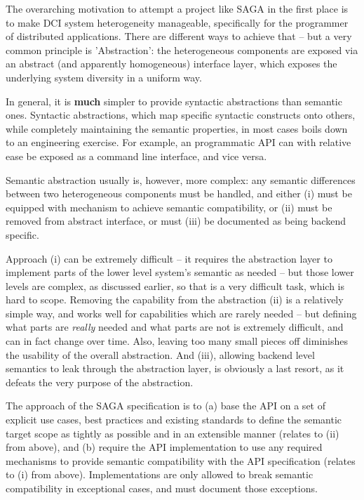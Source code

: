 \documentclass[a4paper,12pt]{article}
\newcommand{\I}[1]{\textit{#1}}
\newcommand{\B}[1]{\textbf{#1}}
\begin{document}
    The overarching motivation to attempt a project like SAGA in the
    first place is to make DCI system heterogeneity manageable,
    specifically for the programmer of distributed applications.
    There are different ways to achieve that -- but a very common
    principle is 'Abstraction': the heterogeneous components are
    exposed via an abstract (and apparently homogeneous) interface
    layer, which exposes the underlying system diversity in a uniform
    way.

    In general, it is \B{much} simpler to provide syntactic
    abstractions than semantic ones.  Syntactic abstractions, which
    map specific syntactic constructs onto others, while completely
    maintaining the semantic properties, in most cases boils down to
    an engineering exercise.  For example, an programmatic API can
    with relative ease be exposed as a command line interface, and
    vice versa.

    Semantic abstraction usually is, however, more complex: any
    semantic differences between two heterogeneous components must be
    handled, and either (i) must be equipped with mechanism to achieve
    semantic compatibility, or (ii) must be removed from abstract
    interface, or must (iii) be documented as being backend specific.

    Approach (i) can be extremely difficult -- it requires the
    abstraction layer to implement parts of the lower level system's
    semantic as needed -- but those lower levels are complex, as 
    discussed earlier, so that is a very difficult task, which is hard
    to scope.  Removing the capability from the abstraction (ii) is a
    relatively simple way, and works well for capabilities which are
    rarely needed -- but defining what parts are \I{really} needed and
    what parts are not is extremely difficult, and can in fact change
    over time.  Also, leaving too many small pieces off diminishes the
    usability of the overall abstraction.  And (iii), allowing backend
    level semantics to leak through the abstraction layer, is
    obviously a last resort, as it defeats the very purpose of the
    abstraction.

    The approach of the SAGA specification is to (a) base the API on a
    set of explicit use cases, best practices and existing standards
    to define the semantic target scope as tightly as possible and in
    an extensible manner (relates to (ii) from above), and (b) require
    the API implementation to use any required mechanisms to provide
    semantic compatibility with the API specification (relates to (i)
    from above).  Implementations are only allowed to break semantic
    compatibility in exceptional cases, and must document those
    exceptions.
\end{document}
